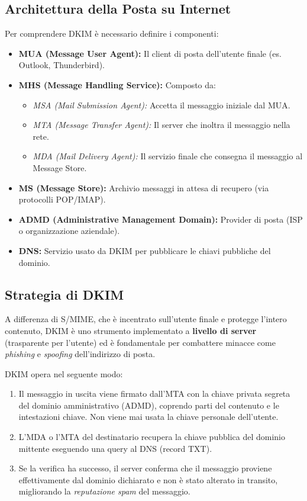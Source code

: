\subsection{Architettura della Posta su Internet}
Per comprendere DKIM è necessario definire i componenti:
\begin{itemize}
    \item \textbf{MUA (Message User Agent):} Il client di posta dell'utente finale (es. Outlook, Thunderbird).
    \item \textbf{MHS (Message Handling Service):} Composto da:
    \begin{itemize}
        \item \textit{MSA (Mail Submission Agent):} Accetta il messaggio iniziale dal MUA.
        \item \textit{MTA (Message Transfer Agent):} Il server che inoltra il messaggio nella rete.
        \item \textit{MDA (Mail Delivery Agent):} Il servizio finale che consegna il messaggio al Message Store.
    \end{itemize}
    \item \textbf{MS (Message Store):} Archivio messaggi in attesa di recupero (via protocolli POP/IMAP).
    \item \textbf{ADMD (Administrative Management Domain):} Provider di posta (ISP o organizzazione aziendale).
    \item \textbf{DNS:} Servizio usato da DKIM per pubblicare le chiavi pubbliche del dominio.
\end{itemize}

\subsection{Strategia di DKIM}

\begin{warnbox}
A differenza di S/MIME, che è incentrato sull'utente finale e protegge l'intero contenuto, DKIM è uno strumento implementato a \textbf{livello di server} (trasparente per l'utente) ed è fondamentale per combattere minacce come \textit{phishing} e \textit{spoofing} dell'indirizzo di posta.
\end{warnbox}

DKIM opera nel seguente modo:
\begin{enumerate}
    \item Il messaggio in uscita viene firmato dall'MTA con la chiave privata segreta del dominio amministrativo (ADMD), coprendo parti del contenuto e le intestazioni chiave. Non viene mai usata la chiave personale dell'utente.
    \item L'MDA o l'MTA del destinatario recupera la chiave pubblica del dominio mittente eseguendo una query al DNS (record TXT).
    \item Se la verifica ha successo, il server conferma che il messaggio proviene effettivamente dal dominio dichiarato e non è stato alterato in transito, migliorando la \textit{reputazione spam} del messaggio.
\end{enumerate}

